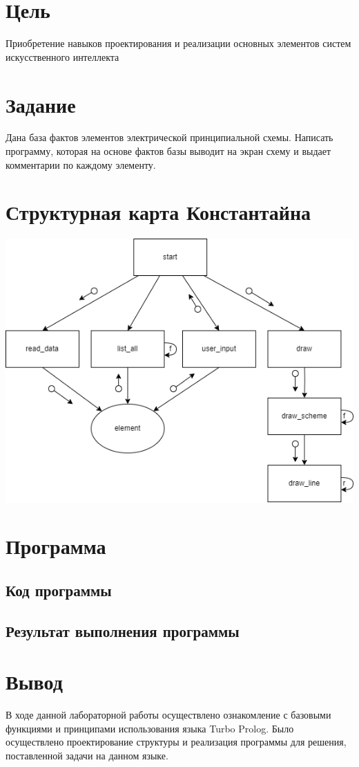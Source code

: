 \documentclass[a4paper, 12pt]{article}
\begin{document}

\pagebreak
\tableofcontents
\newpage
\section*{Цель}
Приобретение навыков проектирования и реализации основных
элементов систем искусственного интеллекта
\section*{Задание}
Дана база фактов элементов электрической принципиальной схемы. Написать программу, которая на основе фактов базы выводит на экран схему и выдает комментарии по каждому элементу.
\newpage
\section{Структурная карта Константайна}
\begin{center}
  \centering
  \includegraphics[width=.7\linewidth]{extra/constantine.png}
  \label{fig:prplot}
\end{center}
\section{Программа}
\subsection{Код программы}
%
\subsection{Результат выполнения программы}
\newpage
\section{Вывод}
В ходе данной лабораторной работы осуществлено
ознакомление с базовыми функциями и принципами использования языка
Turbo Prolog. Было осуществлено проектирование структуры и реализация
программы для решения, поставленной задачи на данном языке.
\end{document}
